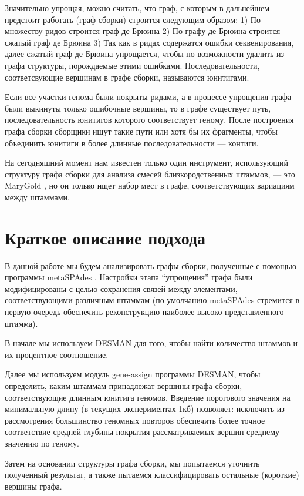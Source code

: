 \documentclass{spbau-diploma}
\begin{document}
Значительно упрощая, можно считать, что граф, с которым в дальнейшем предстоит работать (граф сборки) строится 
следующим образом:
1) По множеству ридов строится граф де Брюина 
2) По графу де Брюина строится сжатый граф де Брюина
3) Так как в ридах содержатся ошибки секвенирования, далее сжатый граф де Брюина упрощается, чтобы по возможности удалить из графа структуры, порождаемые этими ошибками. 
Последовательности, соответсвующие вершинам в графе сборки, называются юнитигами.

Если все участки генома были покрыты ридами, а в процессе упрощения графа были выкинуты только ошибочные вершины, то в графе существует путь, последовательность юнитигов которого соответствует геному. После построения графа сборки сборщики ищут такие пути или хотя бы их фрагменты, чтобы объединить юнитиги в более длинные последовательности --- контиги.

На сегодняшний момент нам известен только один инструмент, использующий структуру графа сборки для анализа смесей близкородственных штаммов, --- это MaryGold \cite{MaryGold}, но он только ищет набор мест в графе, соответствующих вариациям между штаммами. 



\section{Краткое описание подхода}

В данной работе мы будем анализировать графы сборки, полученные с помощью программы metaSPAdes \cite{MetaSpades}. Настройки этапа “упрощения” графа были модифицированы с целью сохранения связей между элементами, соответствующими различным штаммам (по-умолчанию metaSPAdes стремится в первую очередь обеспечить реконструкцию наиболее высоко-представленного штамма). 

В начале мы используем DESMAN для того, чтобы найти количество штаммов и их процентное соотношение. 

Далее мы используем модуль gene-assign программы DESMAN, чтобы определить, каким штаммам принадлежат вершины графа сборки, соответствующие длинным юнитига геномов. Введение порогового значения на минимальную длину (в текущих экспериментах 1кб) позволяет: 
исключить из рассмотрения  большинство геномных повторов 
обеспечить более точное соответствие средней глубины покрытия рассматриваемых вершин среднему значению по геному.

Затем на основании структуры графа сборки, мы попытаемся уточнить полученный результат, а также  пытаемся классифицировать остальные (короткие) вершины графа.
\end{document}

